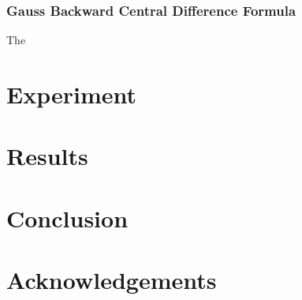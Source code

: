 \documentclass[conference]{acmsiggraph}
\begin{document}
\subsubsection{Gauss Backward Central Difference Formula}
	The 

\section{Experiment}

\section{Results}

\section{Conclusion}

\section*{Acknowledgements}



\end{document}
